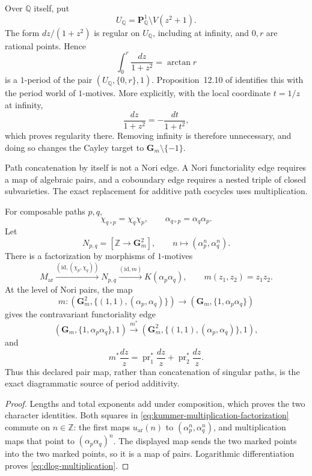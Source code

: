 Over $\mathbb Q$ itself, put
\[
 U_{\mathbb Q}=\mathbf P^1_{\mathbb Q}\setminus V(z^2+1).
\]
The form $dz/(1+z^2)$ is regular on $U_{\mathbb Q}$, including at infinity,
and $0,r$ are rational points.  Hence
\[
 \int_0^r\frac{dz}{1+z^2}=\arctan r
\]
is a $1$-period of the pair $(U_{\mathbb Q},\{0,r\},1)$.
Proposition~12.10 of \cite{HuberWustholz2022} identifies this with the period
world of $1$-motives.  More explicitly, with the local coordinate $t=1/z$ at
infinity,
\[
 \frac{dz}{1+z^2}=-\frac{dt}{1+t^2},
\]
which proves regularity there.  Removing infinity is therefore unnecessary,
and doing so changes the Cayley target to $\mathbf G_m\setminus\{-1\}$.

Path concatenation by itself is not a Nori edge.  A Nori functoriality edge
requires a map of algebraic pairs, and a coboundary edge requires a nested
triple of closed subvarieties.  The exact replacement for additive path
cocycles uses multiplication.

\begin{proposition}
\label{prop:kummer-character-multiplication}
For composable paths $p,q$,
\[
 \chi_{q\circ p}=\chi_q\chi_p,
 \qquad \alpha_{q\circ p}=\alpha_q\alpha_p.
\]
Let
\[
 N_{p,q}=
 [\mathbb Z\longrightarrow\mathbf G_m^2],
 \qquad n\longmapsto(\alpha_p^n,\alpha_q^n).
\]
There is a factorization by morphisms of $1$-motives
\begin{equation}
\label{eq:kummer-multiplication-factorization}
 M_{\mathrm{ar}}
 \xrightarrow{(\mathrm{id},(\chi_p,\chi_q))}N_{p,q}
 \xrightarrow{(\mathrm{id},m)}K(\alpha_p\alpha_q),
 \qquad m(z_1,z_2)=z_1z_2.
\end{equation}
At the level of Nori pairs, the map
\[
 m:(\mathbf G_m^2,\{(1,1),(\alpha_p,\alpha_q)\})
 \longrightarrow(\mathbf G_m,\{1,\alpha_p\alpha_q\})
\]
gives the contravariant functoriality edge
\[
 (\mathbf G_m,\{1,\alpha_p\alpha_q\},1)
 \xrightarrow{m^*}
 (\mathbf G_m^2,\{(1,1),(\alpha_p,\alpha_q)\},1),
\]
and
\begin{equation}
\label{eq:dlog-multiplication}
 m^*\frac{dz}{z}
 =\operatorname{pr}_1^*\frac{dz}{z}
  +\operatorname{pr}_2^*\frac{dz}{z}.
\end{equation}
Thus this declared pair map, rather than concatenation of singular paths,
is the exact diagrammatic source of period additivity.
\end{proposition}

\begin{proof}
Lengths and total exponents add under composition, which proves the two
character identities.  Both squares in
\eqref{eq:kummer-multiplication-factorization} commute on $n\in\mathbb Z$:
the first maps $u_{\mathrm{ar}}(n)$ to
$(\alpha_p^n,\alpha_q^n)$, and multiplication maps that point to
$(\alpha_p\alpha_q)^n$.  The displayed map sends the two marked points into
the two marked points, so it is a map of pairs.  Logarithmic differentiation
proves \eqref{eq:dlog-multiplication}.
\end{proof}

